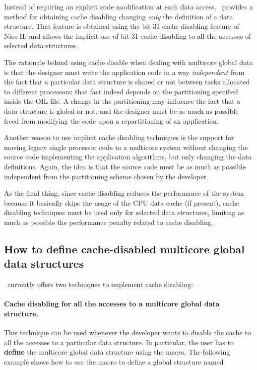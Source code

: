 Instead of requiring an explicit code modification at each data
access, \ee\ provides a method for obtaining cache disabling changing
{\em only} the definition of a data structure. That feature is
obtained using the bit-31 cache disabling feature of Nios II, and
allows the implicit use of bit-31 cache disabling to all the accesses
of selected data structures.

The rationale behind using cache disable when dealing with
multicore global data is that the designer must write the
application code in a way {\em independent} from the fact that a
particular data structure is shared or not between tasks allocated to
different processors: that fact indeed depends on the partitioning
specified inside the OIL file. A change in the partitioning may
influence the fact that a data structure is global or not, and the
designer must be as much as possible freed from modifying the code
upon a repartitioning of an application.

Another reason to use implicit cache disabling techniques is the
support for moving legacy single processor code to a multicore system
without changing the source code implementing the application
algorithms, but only changing the data definitions. Again, the idea is
that the source code must be as much as possible independent from the
partitioning scheme chosen by the developer.

As the final thing, since cache disabling reduces the performance of
the system because it basically skips the usage of the CPU data cache
(if present), cache disabling techniques must be used only for
selected data structures, limiting as much as possible the performance
penalty related to cache disabling.


\subsection{How to define cache-disabled multicore global data structures}

\ee\ currently offers two techniques to implement cache disabling:

\paragraph{Cache disabling for all the accesses to a multicore global
  data structure.}

This technique can be used whenever the developer wants to disable the
cache to all the accesses to a particular data structure. In
particular, the user has to {\bf define} the multicore global data
structure using the 
macro. The following example shows how to use the
macro to define a global structure named

